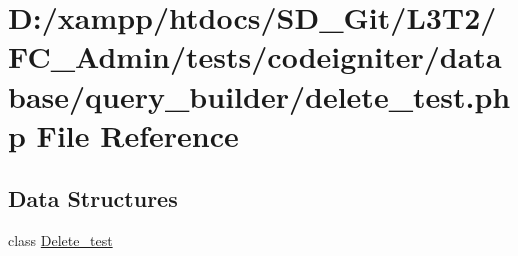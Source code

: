 \hypertarget{_admin_2tests_2codeigniter_2database_2query__builder_2delete__test_8php}{}\section{D\+:/xampp/htdocs/\+S\+D\+\_\+\+Git/\+L3\+T2/\+F\+C\+\_\+\+Admin/tests/codeigniter/database/query\+\_\+builder/delete\+\_\+test.php File Reference}
\label{_admin_2tests_2codeigniter_2database_2query__builder_2delete__test_8php}
\subsection*{Data Structures}
\begin{DoxyCompactItemize}
\item 
class \hyperlink{class_delete__test}{Delete\+\_\+test}
\end{DoxyCompactItemize}
